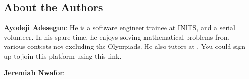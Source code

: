 \documentclass[a4paper]{book}
\begin{document}
\begin{backmatter} %
\chapter*{About the Authors}
\begin{description}
\item \textbf{Ayodeji Adesegun}: He is a software engineer trainee at INITS, and  a serial volunteer. In his spare time, he enjoys solving mathematical problems from various contests not excluding the Olympiads. He also tutors at . You could sign up to join this platform using this link.
\item \textbf{Jeremiah Nwafor}:
\end{description}
\end{backmatter}

\printbibliography
\end{document}
